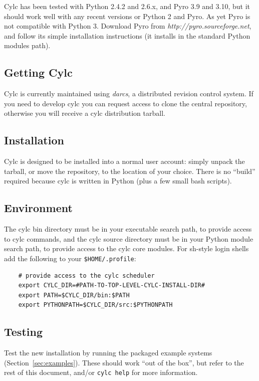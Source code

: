 \documentclass[11pt,a4paper]{article}
\begin{document}
Cylc has been tested with Python 2.4.2 and 2.6.x, and Pyro 3.9 and 3.10,
but it should work well with any recent versions or Python 2 and Pyro.
As yet Pyro is not compatible with Python 3.  Download Pyro from {\em
http://pyro.sourceforge.net}, and follow its simple installation
instructions (it installs in the standard Python modules path).

\subsection{Getting Cylc}

Cylc is currently maintained using {\em darcs}, a distributed revision
control system. If you need to develop cylc you can request access to
clone the central repository, otherwise you will receive a cylc
distribution tarball. 

\subsection{Installation}

Cylc is designed to be installed into a normal user account: simply
unpack the tarball, or move the repository, to the location of your
choice. There is no ``build'' required because cylc is written in Python
(plus a few small bash scripts).

\subsection{Environment}

The cylc bin directory must be in your executable search path, to
provide access to cylc commands, and the cylc source directory must be
in your Python module search path, to provide access to the cylc core
modules. For sh-style login shells add the following to
your \lstinline=$HOME/.profile=:

\lstset{language=bash} 

\begin{lstlisting}
    # provide access to the cylc scheduler
    export CYLC_DIR=#PATH-TO-TOP-LEVEL-CYLC-INSTALL-DIR#
    export PATH=$CYLC_DIR/bin:$PATH
    export PYTHONPATH=$CYLC_DIR/src:$PYTHONPATH
\end{lstlisting}

\subsection{Testing}

Test the new installation by running the packaged example systems
(Section~\ref{sec:examples}). These should work ``out of the box'', but
refer to the rest of this document, and/or \lstinline=cylc help= for
more information.  
\end{document}
